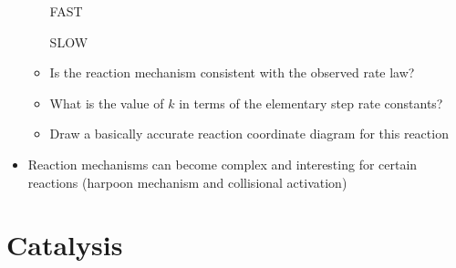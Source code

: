 \documentclass[12pt, openany, letterpaper]{memoir}
\begin{document}
\begin{itemize}
\begin{itemize}
		 \hspace{1em} FAST
		
		 \hspace{1em} SLOW
		\item Is the reaction mechanism consistent with the observed rate law?
		\item What is the value of $k$ in terms of the elementary step rate constants?
		\item Draw a basically accurate reaction coordinate diagram for this reaction
	\end{itemize}
	\item Reaction mechanisms can become complex and interesting for certain reactions (harpoon mechanism and collisional activation)
\end{itemize}
\section{Catalysis}
\end{document}
